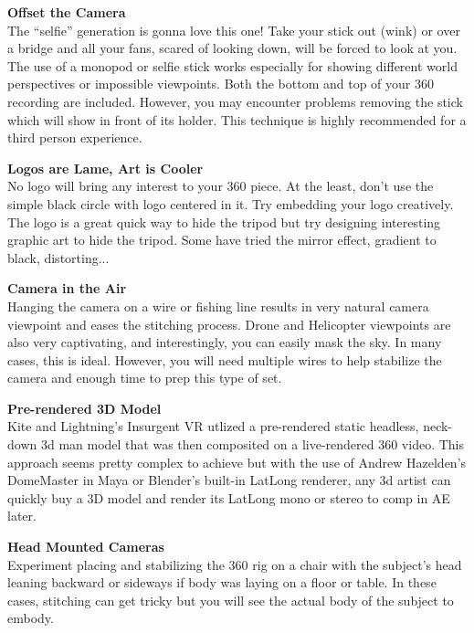 \begin{fullwidth}

{\bfseries Offset the Camera}
\\
The “selfie” generation is gonna love this one! Take your stick out (wink) or over a bridge and all your fans, scared of looking down, will be forced to look at you. The use of a monopod or selfie stick works especially for showing different world perspectives or impossible viewpoints. Both the bottom and top of your 360 recording are included. However, you may encounter problems removing the stick which will show in front of its holder. This technique is highly recommended for a third person experience.


{\bfseries Logos are Lame, Art is Cooler}
\\
No logo will bring any interest to your 360 piece. At the least, don’t use the simple black circle with logo centered in it. Try embedding your logo creatively. The logo is a great quick way to hide the tripod but try designing interesting graphic art to hide the tripod. Some have tried the mirror effect, gradient to black, distorting... 

\clearpage
{\bfseries Camera in the Air}
\\
Hanging the camera on a wire or fishing line results in very natural camera viewpoint and eases the stitching process. Drone and Helicopter viewpoints are also very captivating, and interestingly, you can easily mask the sky. In many cases, this is ideal. However, you will need multiple wires to help stabilize the camera and enough time to prep this type of set.


{\bfseries Pre-rendered 3D Model}
\\
Kite and Lightning’s Insurgent VR utlized a pre-rendered static headless, neck-down 3d man model that was then composited on a live-rendered 360 video. This approach seems pretty complex to achieve but with the use of Andrew Hazelden's DomeMaster in Maya or Blender's built-in LatLong renderer, any 3d artist can quickly buy a 3D model and render its LatLong mono or stereo to comp in AE later. 

\clearpage
{\bfseries Head Mounted Cameras}
\\
Experiment placing and stabilizing the 360 rig on a chair with the subject’s head leaning backward or sideways if body was laying on a floor or table. In these cases, stitching can get tricky but you will see the actual body of the subject to embody.


\end{fullwidth}
